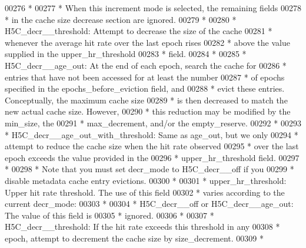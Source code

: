 \begin{DoxyCode}
00276 \textcolor{comment}{ *}
00277 \textcolor{comment}{ *              When this increment mode is selected, the remaining fields}
00278 \textcolor{comment}{ *              in the cache size decrease section are ignored.}
00279 \textcolor{comment}{ *}
00280 \textcolor{comment}{ *      H5C\_decr\_\_threshold: Attempt to decrease the size of the cache}
00281 \textcolor{comment}{ *              whenever the average hit rate over the last epoch rises}
00282 \textcolor{comment}{ *              above the value supplied in the upper\_hr\_threshold}
00283 \textcolor{comment}{ *              field.}
00284 \textcolor{comment}{ *}
00285 \textcolor{comment}{ *      H5C\_decr\_\_age\_out:  At the end of each epoch, search the cache for}
00286 \textcolor{comment}{ *              entries that have not been accessed for at least the number}
00287 \textcolor{comment}{ *              of epochs specified in the epochs\_before\_eviction field, and}
00288 \textcolor{comment}{ *              evict these entries.  Conceptually, the maximum cache size}
00289 \textcolor{comment}{ *              is then decreased to match the new actual cache size.  However,}
00290 \textcolor{comment}{ *              this reduction may be modified by the min\_size, the}
00291 \textcolor{comment}{ *              max\_decrement, and/or the empty\_reserve.}
00292 \textcolor{comment}{ *}
00293 \textcolor{comment}{ *      H5C\_decr\_\_age\_out\_with\_threshold:  Same as age\_out, but we only}
00294 \textcolor{comment}{ *              attempt to reduce the cache size when the hit rate observed}
00295 \textcolor{comment}{ *              over the last epoch exceeds the value provided in the}
00296 \textcolor{comment}{ *              upper\_hr\_threshold field.}
00297 \textcolor{comment}{ *}
00298 \textcolor{comment}{ *      Note that you must set decr\_mode to H5C\_decr\_\_off if you}
00299 \textcolor{comment}{ *      disable metadata cache entry evictions.}
00300 \textcolor{comment}{ *}
00301 \textcolor{comment}{ * upper\_hr\_threshold: Upper hit rate threshold.  The use of this field}
00302 \textcolor{comment}{ *      varies according to the current decr\_mode:}
00303 \textcolor{comment}{ *}
00304 \textcolor{comment}{ *      H5C\_decr\_\_off or H5C\_decr\_\_age\_out:  The value of this field is}
00305 \textcolor{comment}{ *              ignored.}
00306 \textcolor{comment}{ *}
00307 \textcolor{comment}{ *      H5C\_decr\_\_threshold:  If the hit rate exceeds this threshold in any}
00308 \textcolor{comment}{ *              epoch, attempt to decrement the cache size by size\_decrement.}
00309 \textcolor{comment}{ *}

\end{DoxyCode}
